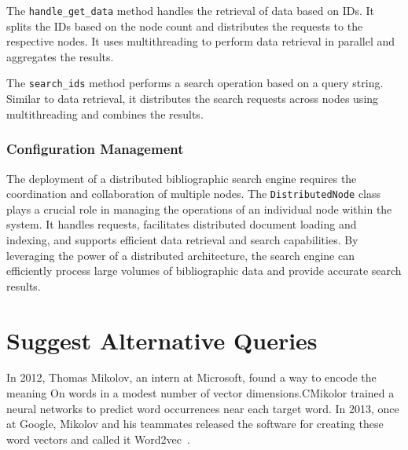 \documentclass{article}
\begin{document}
The \texttt{handle\_get\_data} method handles the retrieval of data based on IDs. It splits the 
IDs based on the node count and distributes the requests to the respective nodes. It uses 
multithreading to perform data retrieval in parallel and aggregates the results.

The \texttt{search\_ids} method performs a search operation based on a query string. Similar to 
data retrieval, it distributes the search requests across nodes using multithreading and 
combines the results.

%

\subsubsection*{Configuration Management}





The deployment of a distributed bibliographic search engine requires the coordination and 
collaboration of multiple nodes. The \texttt{DistributedNode} class plays a crucial role in 
managing the operations of an individual node within the system. It handles requests, 
facilitates distributed document loading and indexing, and supports efficient data retrieval and 
search capabilities. By leveraging the power of a distributed architecture, the search engine 
can efficiently process large volumes of bibliographic data and provide accurate search results.

\section{Suggest Alternative Queries}
In 2012, Thomas Mikolov, an intern at Microsoft, found a way to encode the meaning On words 
in a modest number of vector dimensions.CMikolor trained a neural networks to predict word 
occurrences near each target word. In 2013, once at Google, Mikolov and his teammates 
released the software for creating these word vectors and called it Word2vec~\cite{MCCD13}.
\end{document}
